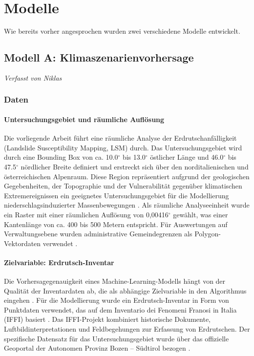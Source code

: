 \documentclass[../main.tex]{subfiles}
\begin{document}
\chapter{Modelle}

Wie bereits vorher angesprochen wurden zwei verschiedene Modelle entwickelt.

\section{Modell A: Klimaszenarienvorhersage}
\vspace{-0.5cm}
\noindent\textit{\small Verfasst von Niklas}
\vspace{0.5cm}


\subsection{Daten}

\subsubsection{Untersuchungsgebiet und räumliche Auflösung}
Die vorliegende Arbeit führt eine räumliche Analyse der Erdrutschanfälligkeit (Landslide Susceptibility Mapping, LSM) durch. Das Untersuchungsgebiet wird durch eine Bounding Box von ca. 10.0$^{\circ}$ bis 13.0$^{\circ}$ östlicher Länge und 46.0$^{\circ}$ bis 47.5$^{\circ}$ nördlicher Breite definiert und erstreckt sich über den norditalienischen und österreichischen Alpenraum.
Diese Region repräsentiert aufgrund der geologischen Gegebenheiten, der Topographie und der Vulnerabilität gegenüber klimatischen Extremereignissen ein geeignetes Untersuchungsgebiet für die Modellierung niederschlagsinduzierter Massenbewegungen \autocite{garianoLandslidesChangingClimate2016}.
Als räumliche Analyseeinheit wurde ein Raster mit einer räumlichen Auflösung von 0,00416$^{\circ}$ gewählt, was einer Kantenlänge von ca. 400 bis 500 Metern entspricht.
Für Auswertungen auf Verwaltungsebene wurden administrative Gemeindegrenzen als Polygon-Vektordaten verwendet \autocite{provinz_bozen_2026}.

\subsubsection{Zielvariable: Erdrutsch-Inventar}
Die Vorhersagegenauigkeit eines Machine-Learning-Modells hängt von der Qualität der Inventardaten ab, die als abhängige Zielvariable in den Algorithmus eingehen \autocite{reichenbachReviewStatisticallybasedLandslide2018}.
Für die Modellierung wurde ein Erdrutsch-Inventar in Form von Punktdaten verwendet, das auf dem Inventario dei Fenomeni Franosi in Italia (IFFI) basiert \autocite{trigilaQualityAssessmentItalian2010}. Das IFFI-Projekt kombiniert historische Dokumente, Luftbildinterpretationen und Feldbegehungen zur Erfassung von Erdrutschen.
Der spezifische Datensatz für das Untersuchungsgebiet wurde über das offizielle Geoportal der Autonomen Provinz Bozen -- Südtirol \autocite{Maps} bezogen \autocite{provinz_bozen_2025a}.
\end{document}
